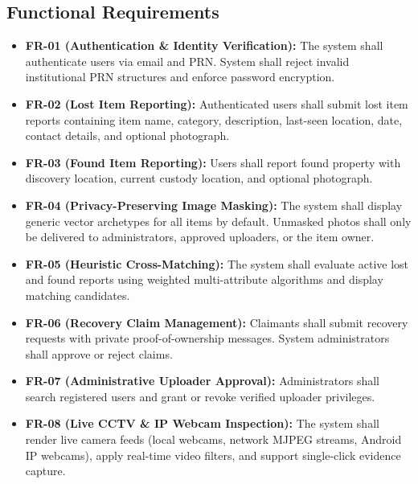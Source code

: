\documentclass[11pt,a4paper]{article}
\begin{document}
\subsection{Functional Requirements}
\begin{itemize}
    \item \textbf{FR-01 (Authentication \& Identity Verification):} The system shall authenticate users via email and PRN. System shall reject invalid institutional PRN structures and enforce password encryption.
    \item \textbf{FR-02 (Lost Item Reporting):} Authenticated users shall submit lost item reports containing item name, category, description, last-seen location, date, contact details, and optional photograph.
    \item \textbf{FR-03 (Found Item Reporting):} Users shall report found property with discovery location, current custody location, and optional photograph.
    \item \textbf{FR-04 (Privacy-Preserving Image Masking):} The system shall display generic vector archetypes for all items by default. Unmasked photos shall only be delivered to administrators, approved uploaders, or the item owner.
    \item \textbf{FR-05 (Heuristic Cross-Matching):} The system shall evaluate active lost and found reports using weighted multi-attribute algorithms and display matching candidates.
    \item \textbf{FR-06 (Recovery Claim Management):} Claimants shall submit recovery requests with private proof-of-ownership messages. System administrators shall approve or reject claims.
    \item \textbf{FR-07 (Administrative Uploader Approval):} Administrators shall search registered users and grant or revoke verified uploader privileges.
    \item \textbf{FR-08 (Live CCTV \& IP Webcam Inspection):} The system shall render live camera feeds (local webcams, network MJPEG streams, Android IP webcams), apply real-time video filters, and support single-click evidence capture.
\end{itemize}
\end{document}
